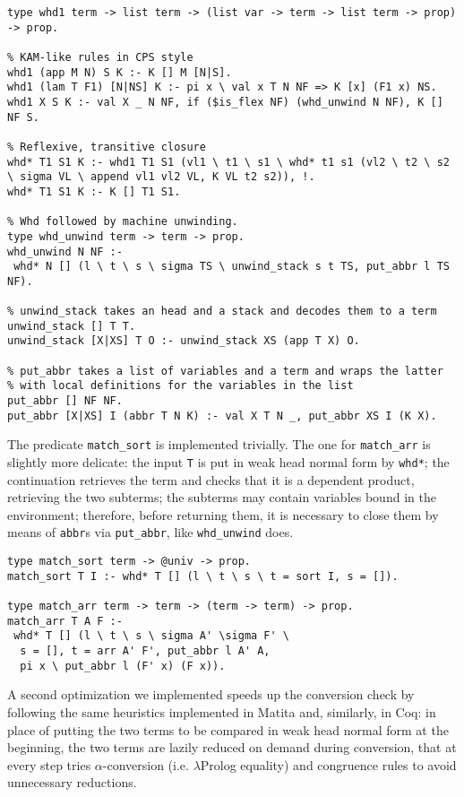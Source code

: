 \begin{verbatim}
type whd1 term -> list term -> (list var -> term -> list term -> prop) -> prop.

% KAM-like rules in CPS style
whd1 (app M N) S K :- K [] M [N|S].
whd1 (lam T F1) [N|NS] K :- pi x \ val x T N NF => K [x] (F1 x) NS.
whd1 X S K :- val X _ N NF, if ($is_flex NF) (whd_unwind N NF), K [] NF S.

% Reflexive, transitive closure
whd* T1 S1 K :- whd1 T1 S1 (vl1 \ t1 \ s1 \ whd* t1 s1 (vl2 \ t2 \ s2 \ sigma VL \ append vl1 vl2 VL, K VL t2 s2)), !.
whd* T1 S1 K :- K [] T1 S1.

% Whd followed by machine unwinding.
type whd_unwind term -> term -> prop.
whd_unwind N NF :-
 whd* N [] (l \ t \ s \ sigma TS \ unwind_stack s t TS, put_abbr l TS NF).

% unwind_stack takes an head and a stack and decodes them to a term
unwind_stack [] T T.
unwind_stack [X|XS] T O :- unwind_stack XS (app T X) O.

% put_abbr takes a list of variables and a term and wraps the latter
% with local definitions for the variables in the list
put_abbr [] NF NF.
put_abbr [X|XS] I (abbr T N K) :- val X T N _, put_abbr XS I (K X).
\end{verbatim}

The predicate \verb+match_sort+ is implemented trivially. The one for \verb+match_arr+ is slightly more delicate: the input \verb+T+ is put in weak head normal form by \verb+whd*+; the continuation retrieves the term and checks that it is a dependent product, retrieving the two subterms; the subterms may contain variables bound in the environment; therefore, before returning them, it is necessary to close them by means of \verb+abbr+s via \verb+put_abbr+, like \verb+whd_unwind+ does.

\begin{verbatim}
type match_sort term -> @univ -> prop.
match_sort T I :- whd* T [] (l \ t \ s \ t = sort I, s = []).

type match_arr term -> term -> (term -> term) -> prop.
match_arr T A F :-
 whd* T [] (l \ t \ s \ sigma A' \sigma F' \
  s = [], t = arr A' F', put_abbr l A' A,
  pi x \ put_abbr l (F' x) (F x)).
\end{verbatim}

A second optimization we implemented speeds up the conversion check by following the same heuristics implemented in Matita and, similarly, in Coq: in place of putting the two terms to be compared in weak head normal form at the beginning, the two terms are lazily reduced on demand during conversion, that at every step tries $\alpha$-conversion (i.e. $\lambda$Prolog equality) and congruence rules to avoid unnecessary reductions.

